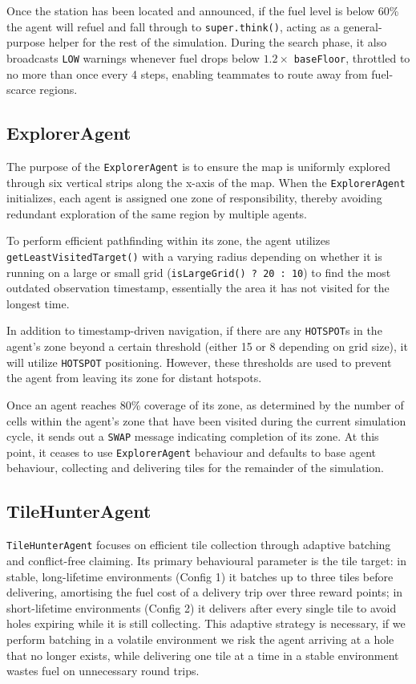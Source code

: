 \documentclass[letterpaper]{article}
\begin{document}
Once the station has been located and announced, if the fuel level is below 60\% the 
agent will refuel and fall through to \texttt{super.think()}, acting as a 
general-purpose helper for the rest of the simulation. During the search phase, it 
also broadcasts \texttt{LOW} warnings whenever fuel drops below $1.2 \times$ 
\texttt{baseFloor}, throttled to no more than once every 4 steps, enabling teammates 
to route away from fuel-scarce regions.


\subsection{ExplorerAgent}
The purpose of the \texttt{ExplorerAgent} is to ensure the map is uniformly explored 
through six vertical strips along the x-axis of the map. When the 
\texttt{ExplorerAgent} initializes, each agent is assigned one zone of responsibility, thereby avoiding redundant exploration of the same region by multiple agents.

To perform efficient pathfinding within its zone, the agent utilizes \texttt{getLeastVisitedTarget()} with a varying radius depending on whether it is 
running on a large or small grid (\texttt{isLargeGrid() ? 20 : 10}) to find the most 
outdated observation timestamp, essentially the area it has not visited for the 
longest time.

In addition to timestamp-driven navigation, if there are any \texttt{HOTSPOT}s in the agent's zone beyond a certain threshold (either 15 or 8 depending on grid size), it will utilize \texttt{HOTSPOT} positioning. However, these thresholds are used to 
prevent the agent from leaving its zone for distant hotspots.

Once an agent reaches 80\% coverage of its zone, as determined by the number of cells within the agent's zone that have been visited during the current simulation cycle, it sends out a \texttt{SWAP} message indicating completion of its zone. At this point, it ceases to use \texttt{ExplorerAgent} behaviour and defaults to base agent behaviour, collecting and delivering tiles for the remainder of the simulation.

\subsection{TileHunterAgent}

\texttt{TileHunterAgent} focuses on efficient tile collection through adaptive
batching and conflict-free claiming. Its primary behavioural parameter is the
tile target: in stable, long-lifetime environments (Config 1) it batches up to
three tiles before delivering, amortising the fuel cost of a delivery trip over
three reward points; in short-lifetime environments (Config 2) it delivers after
every single tile to avoid holes expiring while it is still collecting. This adaptive strategy is necessary, if we perform batching in a volatile environment we risk the agent arriving at
a hole that no longer exists, while delivering one tile at a time in a stable
environment wastes fuel on unnecessary round trips.
\end{document}
